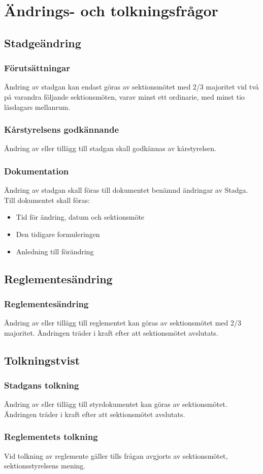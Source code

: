 \section{Ändrings- och tolkningsfrågor}

\subsection{Stadgeändring}

\subsubsection{Förutsättningar}
Ändring av stadgan kan endast göras av sektionsmötet med 2/3 majoritet vid två på varandra följande sektionsmöten, varav minst ett ordinarie, med minst tio läsdagars mellanrum.

\subsubsection{Kårstyrelsens godkännande}
Ändring av eller tillägg till stadgan skall godkännas av kårstyrelsen.
\subsubsection{Dokumentation}
Ändring av stadgan skall föras till dokumentet benämnd ändringar av Stadga. Till dokumentet skall föras:
\begin{itemize}
	\item Tid för ändring, datum och sektionsmöte
	\item Den tidigare formuleringen
	\item Anledning till förändring
\end{itemize}

\subsection{Reglementesändring}

\subsubsection{Reglementesändring}
Ändring av eller tillägg till reglementet kan göras av sektionsmötet med 2/3 majoritet. Ändringen träder i kraft efter att sektionsmötet avslutats.

\subsection{Tolkningstvist}

\subsubsection{Stadgans tolkning}
Ändring av eller tillägg till styrdokumentet kan göras av sektionsmötet. Ändringen träder i kraft efter att sektionsmötet avslutats.

\subsubsection{Reglementets tolkning}
Vid tolkning av reglemente gäller tills frågan avgjorts av sektionsmötet,
sektionsstyrelsens mening.